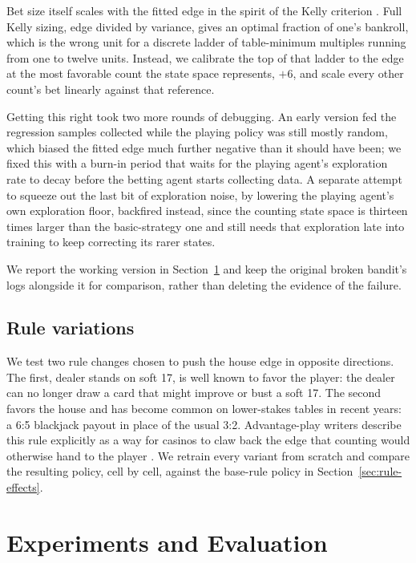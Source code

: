 \documentclass[conference,a4paper]{IEEEtran}
\begin{document}
Bet size itself scales with the fitted edge in the spirit of the Kelly criterion \cite{kelly1956}. Full Kelly sizing, edge divided by variance, gives an optimal fraction of one's bankroll, which is the wrong unit for a discrete ladder of table-minimum multiples running from one to twelve units. Instead, we calibrate the top of that ladder to the edge at the most favorable count the state space represents, $+6$, and scale every other count's bet linearly against that reference.

Getting this right took two more rounds of debugging. An early version fed the regression samples collected while the playing policy was still mostly random, which biased the fitted edge much further negative than it should have been; we fixed this with a burn-in period that waits for the playing agent's exploration rate to decay before the betting agent starts collecting data. A separate attempt to squeeze out the last bit of exploration noise, by lowering the playing agent's own exploration floor, backfired instead, since the counting state space is thirteen times larger than the basic-strategy one and still needs that exploration late into training to keep correcting its rarer states.

We report the working version in Section~\ref{sec:experiments} and keep the original broken bandit's logs alongside it for comparison, rather than deleting the evidence of the failure.

\subsection{Rule variations}
\label{sec:rules}
We test two rule changes chosen to push the house edge in opposite directions. The first, dealer stands on soft 17, is well known to favor the player: the dealer can no longer draw a card that might improve or bust a soft 17. The second favors the house and has become common on lower-stakes tables in recent years: a 6:5 blackjack payout in place of the usual 3:2. Advantage-play writers describe this rule explicitly as a way for casinos to claw back the edge that counting would otherwise hand to the player \cite{thorp}. We retrain every variant from scratch and compare the resulting policy, cell by cell, against the base-rule policy in Section~\ref{sec:rule-effects}.


\section{Experiments and Evaluation}
\label{sec:experiments}
\end{document}
